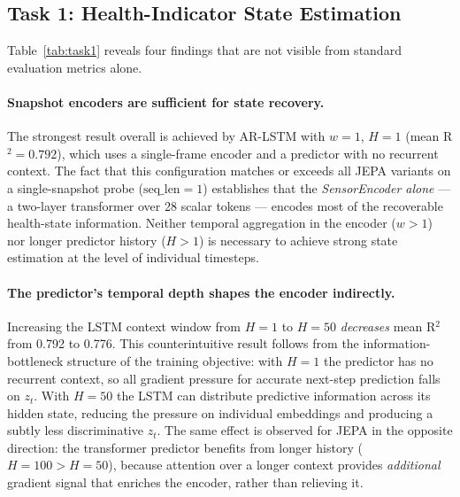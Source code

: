 
\subsection{Task 1: Health-Indicator State Estimation}
\label{sec:task1}

Table~\ref{tab:task1} reveals four findings that are not visible from
standard evaluation metrics alone.

\paragraph{Snapshot encoders are sufficient for state recovery.}
The strongest result overall is achieved by AR-LSTM with $w{=}1$,
$H{=}1$ (mean R$^2 = 0.792$), which uses a single-frame encoder and a
predictor with no recurrent context.  The fact that this configuration
matches or exceeds all JEPA variants on a single-snapshot probe
($\mathrm{seq\_len}{=}1$) establishes that the
\emph{SensorEncoder alone} — a two-layer transformer over 28 scalar tokens —
encodes most of the recoverable health-state information.  Neither temporal
aggregation in the encoder ($w > 1$) nor longer predictor history ($H > 1$)
is necessary to achieve strong state estimation at the level of individual
timesteps.

\paragraph{The predictor's temporal depth shapes the encoder indirectly.}
Increasing the LSTM context window from $H{=}1$ to $H{=}50$ \emph{decreases}
mean R$^2$ from 0.792 to 0.776.  This counterintuitive result follows from the
information-bottleneck structure of the training objective: with $H{=}1$ the
predictor has no recurrent context, so all gradient pressure for accurate
next-step prediction falls on $z_t$.  With $H{=}50$ the LSTM can distribute
predictive information across its hidden state, reducing the pressure on
individual embeddings and producing a subtly less discriminative $z_t$.  The
same effect is observed for JEPA in the opposite direction: the transformer
predictor benefits from longer history ($H{=}100 > H{=}50$), because
attention over a longer context provides \emph{additional} gradient signal
that enriches the encoder, rather than relieving it.

